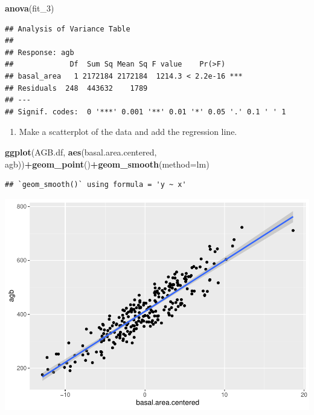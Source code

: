 \documentclass[
]{article}
\newenvironment{Shaded}{\begin{snugshade}}{\end{snugshade}}
\newcommand{\AttributeTok}[1]{\textcolor[rgb]{0.13,0.29,0.53}{#1}}
\newcommand{\FunctionTok}[1]{\textcolor[rgb]{0.13,0.29,0.53}{\textbf{#1}}}
\newcommand{\NormalTok}[1]{#1}
\newcommand{\SpecialCharTok}[1]{\textcolor[rgb]{0.81,0.36,0.00}{\textbf{#1}}}
\providecommand{\tightlist}{%
  \setlength{\itemsep}{0pt}\setlength{\parskip}{0pt}}
\begin{document}
\begin{Shaded}
\begin{Highlighting}[]
\FunctionTok{anova}\NormalTok{(fit\_3)}
\end{Highlighting}
\end{Shaded}

\begin{verbatim}
## Analysis of Variance Table
## 
## Response: agb
##             Df  Sum Sq Mean Sq F value    Pr(>F)    
## basal_area   1 2172184 2172184  1214.3 < 2.2e-16 ***
## Residuals  248  443632    1789                      
## ---
## Signif. codes:  0 '***' 0.001 '**' 0.01 '*' 0.05 '.' 0.1 ' ' 1
\end{verbatim}

\begin{enumerate}
\def\labelenumi{\alph{enumi}.}
\setcounter{enumi}{5}
\tightlist
\item
  Make a scatterplot of the data and add the regression line.
\end{enumerate}

\begin{Shaded}
\begin{Highlighting}[]
\FunctionTok{ggplot}\NormalTok{(AGB.df, }\FunctionTok{aes}\NormalTok{(basal.area.centered, agb))}\SpecialCharTok{+}\FunctionTok{geom\_point}\NormalTok{()}\SpecialCharTok{+}\FunctionTok{geom\_smooth}\NormalTok{(}\AttributeTok{method=}\NormalTok{lm)}
\end{Highlighting}
\end{Shaded}

\begin{verbatim}
## `geom_smooth()` using formula = 'y ~ x'
\end{verbatim}

\includegraphics{Stats-Lab-7_files/figure-latex/unnamed-chunk-8-1.pdf}
\end{document}
